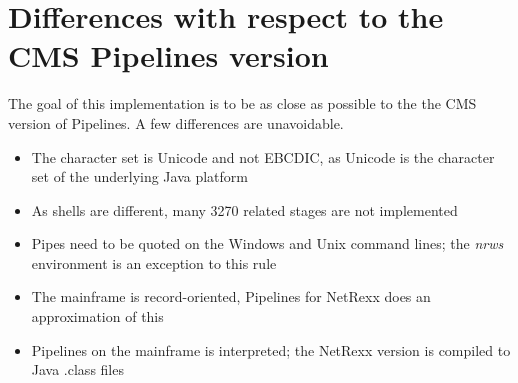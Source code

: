 





\chapter{Differences with respect to the CMS Pipelines version}
The goal of this implementation is to be as close as possible to the
the CMS version of Pipelines. A few differences are unavoidable.

\begin{itemize}
\item The character set is Unicode and not EBCDIC, as Unicode is the
  character set of the underlying Java platform
\item As shells are different, many 3270 related stages are not
  implemented
 \item Pipes need to be quoted on the Windows and Unix command lines;
   the \emph{nrws} environment is an exception to this rule
\item The mainframe is record-oriented, Pipelines for NetRexx does
  an approximation of this
\item Pipelines on the mainframe is interpreted; the NetRexx
  version is compiled to Java .class files
\end{itemize}

